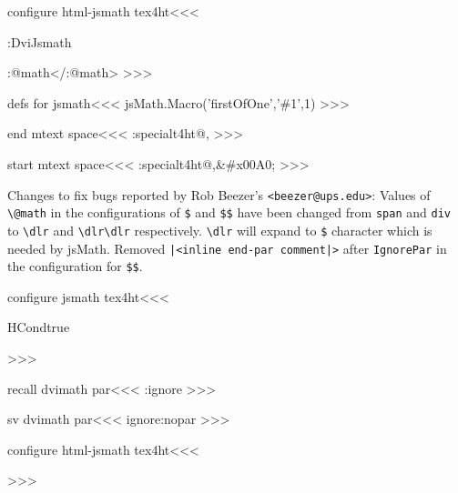 \<configure html-jsmath tex4ht\><<<
    {\a:DviJsmath \mathltxtrue
       \ifOption{mml-fonts}{}{|%
       \IgnoreRule
       \ifx \a:@math\empty\else
               \Tg<\a:@math\space class="math"\Hnewline >\fi
       \a:math
       |<sv dvimath par|>\IgnorePar}
    {\ifx \a:@math\empty\else \Tg</\a:@math>\fi \EndIgnoreRule
     \ifOption{mml-fonts}{}{|%
     \mathltxfalse \After:Math \b:DviJsmath %
    }
>>>



\<defs for jsmath\><<<
jsMath.Macro('firstOfOne','\#1',1)
>>>



\<end mtext space\><<<
\ht:special{t4ht@,}%
>>>

\<start mtext space\><<<
\ht:special{t4ht@,&\#x00A0;}%
>>>

Changes to fix bugs reported by Rob Beezer's
\texttt{<beezer@ups.edu>}: Values of \verb=\@math= in the
configurations of \verb=$= and \verb=$$= have been changed from
\verb=span= and \verb=div= to \verb=\dlr= and \verb=\dlr\dlr=
respectively.  \verb=\dlr= will expand to \verb=$= character which is
needed by jsMath. Removed \verb=|<inline end-par comment|>= after
\verb=IgnorePar= in the configuration for \verb=$$=.


\<configure jsmath tex4ht\><<<
\def\dlr{\expandafter\@gobble\string\$}
\Configure{$}
   {\Configure{@math}{\dlr}\DviMath}
   {\EndDviMath}{}
\Configure{$$} 
   {\Configure{@math}{\dlr\dlr}\IgnorePar
    \EndP\DviMath}
   {\EndDviMath
       \ShowPar\par{\csname HCondtrue\endcsname\noindent}}
   {\DisplayMathtrue}
>>>

\<recall dvimath par\><<<
\sv:ignore
>>>

\<sv dvimath par\><<<
\edef\sv:ignore{\if:nopar  
    \noexpand\IgnorePar\else \noexpand\ShowPar\fi}%
>>>

\<configure html-jsmath tex4ht\><<<
   {\ifvmode \IgnorePar\fi \EndP{}\par\ShowPar}
>>>



}}
